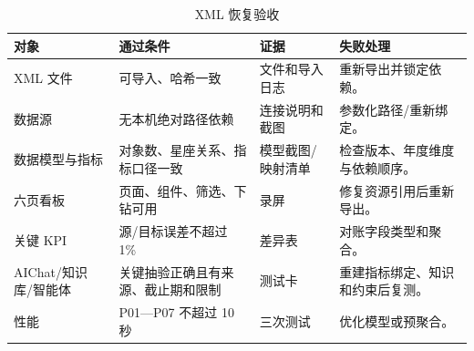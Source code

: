 \documentclass[UTF8,fontset=windows,12pt,openany]{ctexbook}
\begin{document}
\begin{longtable}{p{3.6cm}p{3.3cm}p{3.3cm}p{3.4cm}}
\caption{XML 恢复验收}\label{tab:xml-recovery}\\
\toprule
\textbf{对象} & \textbf{通过条件} & \textbf{证据} & \textbf{失败处理}\\
\midrule
XML 文件 & 可导入、哈希一致 & 文件和导入日志 & 重新导出并锁定依赖。\\
数据源 & 无本机绝对路径依赖 & 连接说明和截图 & 参数化路径/重新绑定。\\
数据模型与指标 & 对象数、星座关系、指标口径一致 & 模型截图/映射清单 & 检查版本、年度维度与依赖顺序。\\
六页看板 & 页面、组件、筛选、下钻可用 & 录屏 & 修复资源引用后重新导出。\\
关键 KPI & 源/目标误差不超过 1\% & 差异表 & 对账字段类型和聚合。\\
AIChat/知识库/智能体 & 关键抽验正确且有来源、截止期和限制 & 测试卡 & 重建指标绑定、知识和约束后复测。\\
性能 & P01—P07 不超过 10 秒 & 三次测试 & 优化模型或预聚合。\\
\bottomrule
\end{longtable}
\end{document}
